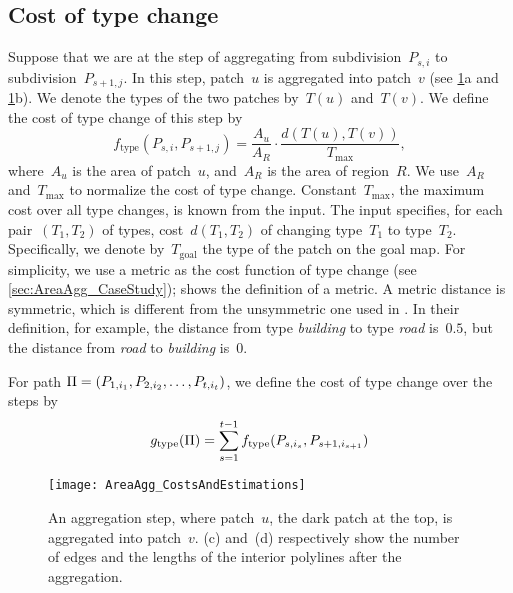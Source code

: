 \subsection{Cost of type change}
\label{sec:AreaAgg_f_type}

Suppose that we are at the step of aggregating 
from subdivision~$P_{s,i}$ to subdivision~$P_{s+1,j}$. 
In this step, patch~$u$ is aggregated into patch~$v$
(see \figs\ref{fig:AreaAgg_FirstStep}a 
and \ref{fig:AreaAgg_FirstStep}b).
We denote the types of the two patches by~$T(u)$ and~$T(v)$. 
We define the cost of type change of this step by
\begin{equation}
\label{eq:f_type}
f_\mathrm{type}(P_{s,i},P_{s+1,j})=\frac{A_{u}}{A_R}
\cdot
\frac{d(T(u),T(v))}{T_{\max}},
\end{equation}
where~$A_u$ is the area of patch~$u$, 
and~$A_R$ is the area of region~$R$.
We use~$A_R$ and~$T_{\max}$ 
to normalize the cost of type change. 
Constant~$T_{\max}$, the maximum cost over all type changes,  
is known from the input. 
The input specifies, for each pair~$(T_1,T_2)$ of types, 
cost~$d(T_1,T_2)$ of changing type~$T_1$ to type~$T_2$.
Specifically, we denote by~$T_\mathrm{goal}$ the type of 
the patch on the goal map.
For simplicity, we use a metric 
as the cost function of type change
(see \sect\ref{sec:AreaAgg_CaseStudy}); 
\textcite[]{Choudhary1992Elements}
shows the definition of a metric.
A metric distance is symmetric, 
which is different from the unsymmetric one used in
\textcite{Dilo2009tGAP}.
In their definition, for example, 
the distance from type \emph{building} to type \emph{road} is~$0.5$,
but the distance from \emph{road} to \emph{building} is~$0$.

For path $\Pi=(P_{1,i_1}, P_{2,i_2}, \dots, 
P_{t,i_{t}})$,
we define the cost of type change over the steps by
\begin{equation}
\label{eq:g_type}
g_\mathrm{type}(\Pi)=
\sum_{s=1}^{t-1}f_\mathrm{type}(P_{s,i_s},P_{s+1,i_{s+1}})
\end{equation}

\begin{figure}[tb]
\centering
\texttt{[image: AreaAgg\_CostsAndEstimations]}
\caption{An aggregation step, 
	where patch~$u$, the dark patch at the top,
	is aggregated into patch~$v$.
	\figs(c) and~(d) respectively show the number of 
	edges and the lengths of the interior polylines after 
	the aggregation.}
\label{fig:AreaAgg_FirstStep}	
\end{figure}


